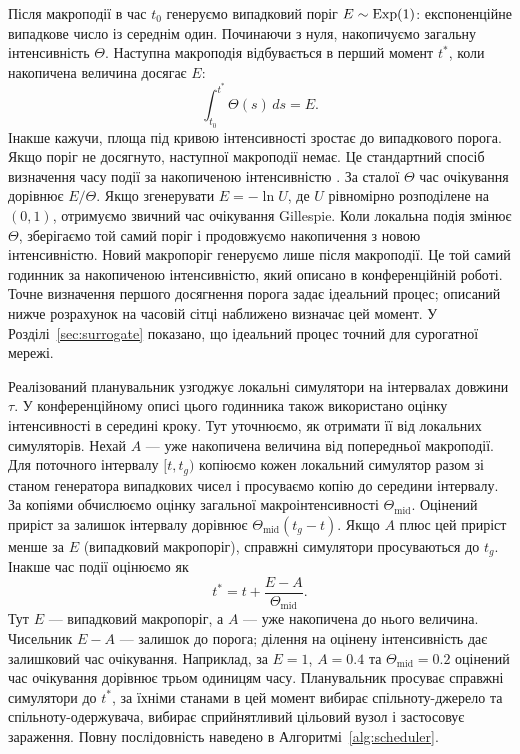 Після макроподії в час $t_0$ генеруємо випадковий поріг $E\sim\mathrm{Exp}(1)$: експоненційне випадкове число із середнім один. Починаючи з нуля, накопичуємо загальну інтенсивність $\Theta$. Наступна макроподія відбувається в перший момент $t^\ast$, коли накопичена величина досягає $E$:
\begin{equation}
\label{eq:hazard_integral}
\int_{t_0}^{t^\ast}\Theta(s)\,ds=E.
\end{equation}
Інакше кажучи, площа під кривою інтенсивності зростає до випадкового порога. Якщо поріг не досягнуто, наступної макроподії немає. Це стандартний спосіб визначення часу події за накопиченою інтенсивністю \citep{ethier1986,anderson2007}. За сталої $\Theta$ час очікування дорівнює $E/\Theta$. Якщо згенерувати $E=-\ln U$, де $U$ рівномірно розподілене на $(0,1)$, отримуємо звичний час очікування Gillespie. Коли локальна подія змінює $\Theta$, зберігаємо той самий поріг і продовжуємо накопичення з новою інтенсивністю. Новий макропоріг генеруємо лише після макроподії. Це той самий годинник за накопиченою інтенсивністю, який описано в конференційній роботі. Точне визначення першого досягнення порога задає ідеальний процес; описаний нижче розрахунок на часовій сітці наближено визначає цей момент. У Розділі~\ref{sec:surrogate} показано, що ідеальний процес точний для сурогатної мережі.

Реалізований планувальник узгоджує локальні симулятори на інтервалах довжини $\tau$. У конференційному описі цього годинника також використано оцінку інтенсивності в середині кроку. Тут уточнюємо, як отримати її від локальних симуляторів. Нехай $A$ --- уже накопичена величина від попередньої макроподії. Для поточного інтервалу $[t,t_g)$ копіюємо кожен локальний симулятор разом зі станом генератора випадкових чисел і просуваємо копію до середини інтервалу. За копіями обчислюємо оцінку загальної макроінтенсивності $\Theta_{\mathrm{mid}}$. Оцінений приріст за залишок інтервалу дорівнює $\Theta_{\mathrm{mid}}(t_g-t)$. Якщо $A$ плюс цей приріст менше за $E$ (випадковий макропоріг), справжні симулятори просуваються до $t_g$. Інакше час події оцінюємо як
\begin{equation}
\label{eq:interpolation}
t^\ast=t+\frac{E-A}{\Theta_{\mathrm{mid}}}.
\end{equation}
Тут $E$ --- випадковий макропоріг, а $A$ --- уже накопичена до нього величина. Чисельник $E-A$ --- залишок до порога; ділення на оцінену інтенсивність дає залишковий час очікування. Наприклад, за $E=1$, $A=0.4$ та $\Theta_{\mathrm{mid}}=0.2$ оцінений час очікування дорівнює трьом одиницям часу. Планувальник просуває справжні симулятори до $t^\ast$, за їхніми станами в цей момент вибирає спільноту-джерело та спільноту-одержувача, вибирає сприйнятливий цільовий вузол і застосовує зараження. Повну послідовність наведено в Алгоритмі~\ref{alg:scheduler}.


